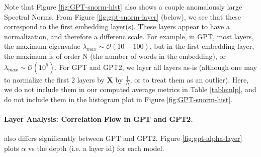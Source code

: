 Note that Figure \ref{fig:GPT-snorm-hist} also shows a couple anomalously  large Spectral Norms.
From Figure \ref{fig:gpt-snorm-layer} (below), we see that these correspond to the first embedding layer(s).
These layers appear to have a normalization, and therefore a differenc scale.
For example, in GPT, most layers, the maximum eigenvalue $\lambda_{max}\sim\mathcal{O}(10-100)$,
but in the first embedding layer, the maximum is of order N (the number of words in the embedding), or
 $\lambda_{max}\sim\mathcal{O}(10^{5})$.  For GPT and GPT2, we layer all layers as-is (although one may to normalize
the first 2 layers by  $\mathbf{X}$ by $\frac{1}{N}$, or to treat them as an outlier).
Here, we do not include them in our computed average metrics in Table \ref{table:nlp},
and do not include them in the histogram plot in Figure \ref{fig:GPT-snorm-hist}.


\paragraph{Layer Analysis: Correlation Flow in GPT and GPT2.} 

also differs significantly between GPT and GPT2.
Figure \ref{fig:gpt-alpha-layer} plots $\alpha$ vs the depth (i.e. a layer id) for each model.


